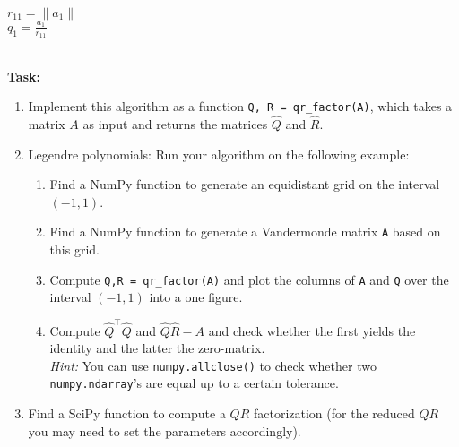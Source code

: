 \hspace*{1cm}\begin{minipage}{0.8\textwidth}
	\begin{algorithm}[H]
		$r_{11} = \| a_1 \|$\\
		$q_1 = \frac{a_1}{r_{11}}$\\
	\end{algorithm}
\end{minipage}
~\\
\textbf{Task:} 
\begin{enumerate}
	\item Implement this algorithm as a function \verb|Q, R = qr_factor(A)|, which takes a matrix $A$ as input and returns the matrices $\widehat{Q}$ and $\widehat{R}$.
	\item Legendre polynomials: Run your algorithm on the following example:
	\begin{enumerate}
		\item Find a NumPy function to generate an equidistant grid on the interval $(-1,1)$.
		\item Find a NumPy function to generate a Vandermonde matrix \texttt{A} based on this grid.
		\item Compute \texttt{Q,R = qr\_factor(A)} and plot the columns of \texttt{A} and \texttt{Q} over the interval $(-1,1)$ into a one figure.
		\item Compute $\widehat{Q}^\top \widehat{Q}$ and $\widehat{Q}\widehat{R} - A$ and check whether the first yields the identity and the latter the zero-matrix.\\
		\textit{Hint: } You can use \texttt{numpy.allclose()} to check whether two \texttt{numpy.ndarray}'s are equal up to a certain tolerance.
	\end{enumerate} 
	\item Find a SciPy function to compute a $QR$ factorization (for the reduced $QR$ you may need to set the parameters accordingly).
\end{enumerate}

